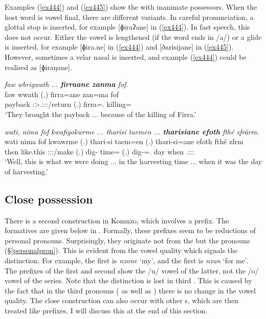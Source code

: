 Examples (\ref{ex444}) and (\ref{ex445}) show the   with inanimate possessors. When the host word is vowel final, there are different variants. In careful pronunciation, a glottal stop is inserted, for example [ɸiraʔane] in (\ref{ex444}). In fast speech, this does not occur. Either the vowel is lengthened (if the word ends in /a/) or a glide is inserted, for example [ɸira.ne] in (\ref{ex444}) and [ðarisijane] in (\ref{ex445}). However, sometimes a velar nasal is inserted, and example (\ref{ex444}) could be realised as [ɸiraŋane]. 

\begin{exe}
	\ex \emph{faw wbrigwath ... \textbf{firraane zanma} fof.}\\
	\gll faw wwath (.) firra=ane zan=ma fof\\
	payback \Stpl:\Sbj>\Tsg.\F:\Obj:\Pst:\Ipfv/return (.) firra=\Poss.\Sg{} killing=\Char{} \Emph\\
	\trans `They brought the payback ... because of the killing of Firra.'\\
	\label{ex444}
\end{exe}
\begin{exe}
	\ex \emph{wati, nima fof kwafiyokwrme ... tharisi taemen ... \textbf{tharisiane efoth} fthé zfrärm.}\\
	\gll wati nima fof kwawrme (.) thari-si taem=en (.) thari-si=ane efoth fthé zfrm\\
	then {like.this} \Emph{} \Fpl:\Sbj:\Pst:\Dur/make (.) dig-\Nmlz{} time=\Loc{} (.) dig-\Nmlz=\Poss.\Sg{} day when \Tsg.\F:\Sbj:\Pst:\Dur{}\\
	\trans `Well, this is what we were doing ... in the harvesting time ... when it was the day of harvesting.'
	\label{ex445}
\end{exe}

\subsection{Close possession} \label{closeposs}

There is a second  construction in Komnzo, which involves a prefix. The formatives are given below in . Formally, these prefixes seem to be reductions of personal pronouns. Surprisingly, they originate not from the  but the  pronouns (\S{}\ref{personalpron}). This is evident from the vowel quality which signals the  distinction. For example, the first     is \emph{nzone} `my', and the first    is \emph{nzun} `for me'. The  prefixes of the first and second  show the /u/ vowel of the latter, not the /o/ vowel of the  series. Note that the  distinction is lost in third . This is caused by the fact that in the third  pronouns ( as well as ) there is no change in the vowel quality. The close  construction can also occur with other s, which are then treated like prefixes. I will discuss this at the end of this section.


